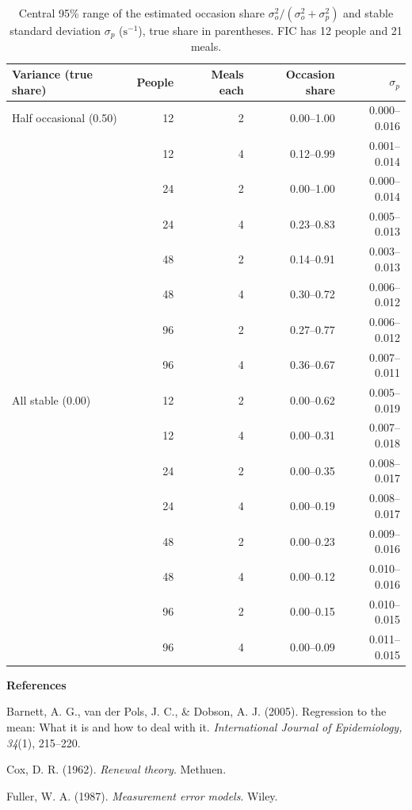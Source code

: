 \documentclass[12pt]{article}
\theoremstyle{definition}
\begin{document}
\begin{table}[H]
\centering\footnotesize
\caption{Central 95\% range of the estimated occasion share
$\sigma_o^2/(\sigma_o^2+\sigma_p^2)$ and stable standard deviation $\sigma_p$
($\mathrm{s}^{-1}$), true share in parentheses. FIC has 12 people and 21 meals.}\label{tab:pilot}
\begin{tabular}{@{}lrrrr@{}}
\toprule
Variance (true share) & People & Meals each & Occasion share & $\sigma_p$\\
\midrule
Half occasional (0.50) & 12 & 2 & 0.00--1.00 & 0.000--0.016\\
 & 12 & 4 & 0.12--0.99 & 0.001--0.014\\
 & 24 & 2 & 0.00--1.00 & 0.000--0.014\\
 & 24 & 4 & 0.23--0.83 & 0.005--0.013\\
 & 48 & 2 & 0.14--0.91 & 0.003--0.013\\
 & 48 & 4 & 0.30--0.72 & 0.006--0.012\\
 & 96 & 2 & 0.27--0.77 & 0.006--0.012\\
 & 96 & 4 & 0.36--0.67 & 0.007--0.011\\
All stable (0.00) & 12 & 2 & 0.00--0.62 & 0.005--0.019\\
 & 12 & 4 & 0.00--0.31 & 0.007--0.018\\
 & 24 & 2 & 0.00--0.35 & 0.008--0.017\\
 & 24 & 4 & 0.00--0.19 & 0.008--0.017\\
 & 48 & 2 & 0.00--0.23 & 0.009--0.016\\
 & 48 & 4 & 0.00--0.12 & 0.010--0.016\\
 & 96 & 2 & 0.00--0.15 & 0.010--0.015\\
 & 96 & 4 & 0.00--0.09 & 0.011--0.015\\
\bottomrule
\end{tabular}
\end{table}

\bigskip
\noindent\textbf{References}

\begingroup\small
\setlength{\parindent}{-0.3in}\setlength{\leftskip}{0.3in}\setlength{\parskip}{3pt}

Barnett, A. G., van der Pols, J. C., \& Dobson, A. J. (2005). Regression to the mean: What it is and how to deal with it. \emph{International Journal of Epidemiology, 34}(1), 215--220.

Cox, D. R. (1962). \emph{Renewal theory}. Methuen.

Fuller, W. A. (1987). \emph{Measurement error models}. Wiley.
\end{document}
